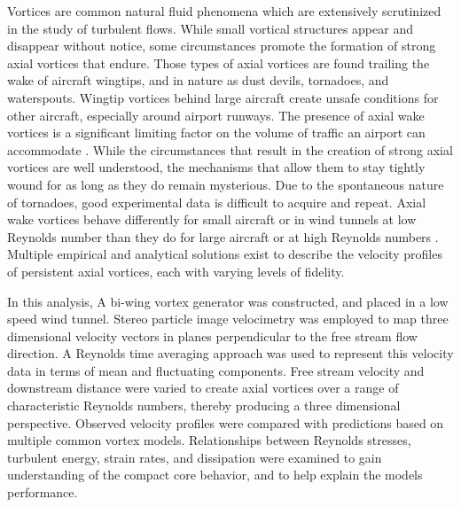 Vortices are common natural fluid phenomena which are extensively scrutinized 
in the study of turbulent flows. While small vortical structures appear and 
disappear without notice, some circumstances promote the formation of strong 
axial vortices that endure. Those types of axial vortices are found trailing 
the wake of aircraft wingtips, and in nature as dust devils, tornadoes, and 
waterspouts. Wingtip vortices behind large aircraft create unsafe conditions 
for other aircraft, especially around airport runways. The presence of axial 
wake vortices is a significant limiting factor on the volume of traffic an 
airport can accommodate \cite{hallock1991}. While the circumstances that result 
in the creation of strong axial vortices are well understood, the mechanisms 
that allow them to stay tightly wound for as long as they do remain mysterious. 
Due to the spontaneous nature of tornadoes, good experimental data is difficult 
to acquire and repeat. Axial wake vortices behave differently for 
small aircraft or in wind tunnels at low Reynolds number than they do for large 
aircraft or at high Reynolds numbers \cite{burnam2013}. Multiple empirical and 
analytical solutions exist to describe the velocity profiles of persistent 
axial vortices, each with varying levels of fidelity.

In this analysis, A bi-wing vortex generator was constructed, and placed in 
a low speed wind tunnel. Stereo particle image velocimetry was employed to 
map three dimensional velocity vectors in planes perpendicular to the free 
stream flow direction. A Reynolds time 
averaging approach was used to represent this velocity data in terms of mean 
and fluctuating components. Free stream velocity and downstream distance 
were varied to create axial vortices over a range of characteristic Reynolds 
numbers, thereby producing a three dimensional perspective. Observed velocity 
profiles were compared with predictions based on multiple common vortex models. 
Relationships between 
Reynolds stresses, turbulent energy, strain rates, and dissipation were
examined to gain understanding of the compact core behavior, and to help 
explain the models performance.